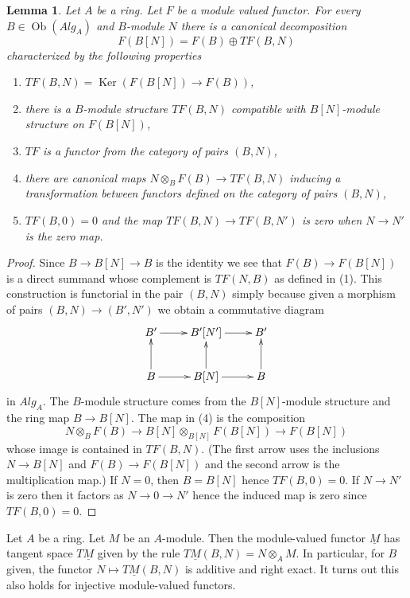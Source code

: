 \documentclass{stacks-project}
\theoremstyle{plain}
\newtheorem{lemma}[subsection]{Lemma}
\theoremstyle{definition}
\theoremstyle{remark}
\numberwithin{equation}{subsection}
\def\Ob{\mathop{\mathrm{Ob}}\nolimits}
\def\Ker{\mathop{\mathrm{Ker}}}
\begin{document}
\begin{lemma}
\label{lemma-tangent-functor}
Let $A$ be a ring. Let $F$ be a module valued functor.
For every $B \in \Ob(\textit{Alg}_A)$ and $B$-module $N$
there is a canonical decomposition
$$
F(B[N]) = F(B) \oplus TF(B, N)
$$
characterized by the following properties
\begin{enumerate}
\item $TF(B, N) = \Ker(F(B[N]) \to F(B))$,
\item there is a $B$-module structure $TF(B, N)$
compatible with $B[N]$-module structure on $F(B[N])$,
\item $TF$ is a functor from the category of pairs $(B, N)$,
\item
\label{item-mult-map}
there are canonical maps $N \otimes_B F(B) \to TF(B, N)$
inducing a transformation between functors defined on the category
of pairs $(B, N)$,
\item $TF(B, 0) = 0$ and the map $TF(B, N) \to TF(B, N')$ is
zero when $N \to N'$ is the zero map.
\end{enumerate}
\end{lemma}

\begin{proof}
Since $B \to B[N] \to B$ is the identity we see that $F(B) \to F(B[N])$
is a direct summand whose complement is $TF(N, B)$ as defined in (1).
This construction is functorial in the pair $(B, N)$ simply because
given a morphism of pairs $(B, N) \to (B', N')$ we obtain a commutative
diagram
$$
\xymatrix{
B' \ar[r] & B'[N'] \ar[r] & B' \\
B \ar[r] \ar[u] & B[N] \ar[r] \ar[u] & B \ar[u]
}
$$
in $\textit{Alg}_A$. The $B$-module structure comes from the $B[N]$-module
structure and the ring map $B \to B[N]$. The map in (4) is the
composition
$$
N \otimes_B F(B) \longrightarrow
B[N] \otimes_{B[N]} F(B[N]) \longrightarrow F(B[N])
$$
whose image is contained in $TF(B, N)$. (The first arrow uses the inclusions
$N \to B[N]$ and $F(B) \to F(B[N])$ and the second arrow is the multiplication
map.) If $N = 0$, then $B = B[N]$
hence $TF(B, 0) = 0$. If $N \to N'$ is zero then it factors as
$N \to 0 \to N'$ hence the induced map is zero since $TF(B, 0) = 0$.
\end{proof}

\noindent
Let $A$ be a ring. Let $M$ be an $A$-module. Then the module-valued functor
$\underline{M}$ has tangent space $T\underline{M}$ given by the rule
$T\underline{M}(B, N) = N \otimes_A M$. In particular, for $B$ given, the
functor $N \mapsto T\underline{M}(B, N)$ is additive and right exact. It turns
out this also holds for injective module-valued functors.
\end{document}

